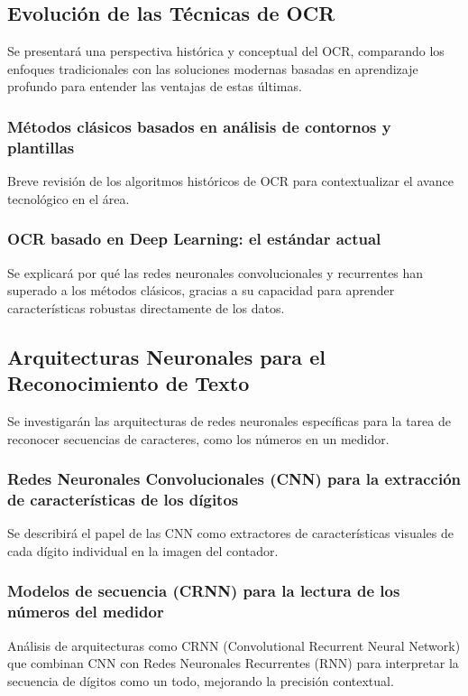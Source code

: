 \subsection{Evolución de las Técnicas de OCR}
\label{ssec:evolucion_ocr}
Se presentará una perspectiva histórica y conceptual del OCR, comparando los enfoques tradicionales con las soluciones modernas basadas en aprendizaje profundo para entender las ventajas de estas últimas.

\subsubsection{Métodos clásicos basados en análisis de contornos y plantillas}
\label{sssec:ocr_clasico}
Breve revisión de los algoritmos históricos de OCR para contextualizar el avance tecnológico en el área.

\subsubsection{OCR basado en Deep Learning: el estándar actual}
\label{sssec:ocr_dl}
Se explicará por qué las redes neuronales convolucionales y recurrentes han superado a los métodos clásicos, gracias a su capacidad para aprender características robustas directamente de los datos.

\subsection{Arquitecturas Neuronales para el Reconocimiento de Texto}
\label{ssec:arquitecturas_ocr}
Se investigarán las arquitecturas de redes neuronales específicas para la tarea de reconocer secuencias de caracteres, como los números en un medidor.

\subsubsection{Redes Neuronales Convolucionales (CNN) para la extracción de características de los dígitos}
\label{sssec:cnn_ocr}
Se describirá el papel de las CNN como extractores de características visuales de cada dígito individual en la imagen del contador.

\subsubsection{Modelos de secuencia (CRNN) para la lectura de los números del medidor}
\label{sssec:crnn}
Análisis de arquitecturas como CRNN (Convolutional Recurrent Neural Network) que combinan CNN con Redes Neuronales Recurrentes (RNN) para interpretar la secuencia de dígitos como un todo, mejorando la precisión contextual.

